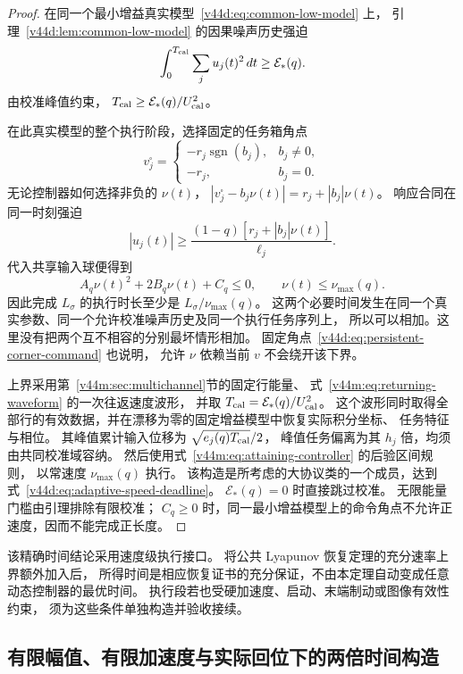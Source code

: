 \documentclass[11pt,a4paper]{article}
\numberwithin{equation}{section}
\theoremstyle{definition}
\begin{document}
\begin{proof}
在同一个最小增益真实模型~\eqref{v44d:eq:common-low-model} 上，
引理~\ref{v44d:lem:common-low-model} 的因果噪声历史强迫
\[
 \int_0^{T_{\rm cal}}\sum_j u_j(t)^2\,dt\ge\mathcal E_*(q).
\]
由校准峰值约束，
$T_{\rm cal}\ge\mathcal E_*(q)/U_{\rm cal}^2$。

在此真实模型的整个执行阶段，选择固定的任务箱角点
\begin{equation}
 v_j^\square=
 \begin{cases}
 -r_j\operatorname{sgn}(b_j),&b_j\ne0,\\
 -r_j,&b_j=0.
 \end{cases}
 \label{v44d:eq:persistent-corner-command}
\end{equation}
无论控制器如何选择非负的 $\nu(t)$，
$|v_j^\square-b_j\nu(t)|=r_j+|b_j|\nu(t)$。
响应合同在同一时刻强迫
\[
 |u_j(t)|\ge
 \frac{(1-q)[r_j+|b_j|\nu(t)]}{\ell_j}.
\]
代入共享输入球便得到
\[
 A_q\nu(t)^2+2B_q\nu(t)+C_q\le0,
 \qquad \nu(t)\le\nu_{\max}(q).
\]
因此完成 $L_\sigma$ 的执行时长至少是
$L_\sigma/\nu_{\max}(q)$。
这两个必要时间发生在同一个真实参数、同一个允许校准噪声历史及同一个执行任务序列上，
所以可以相加。这里没有把两个互不相容的分别最坏情形相加。
固定角点~\eqref{v44d:eq:persistent-corner-command} 也说明，
允许 $\nu$ 依赖当前 $v$ 不会绕开该下界。

上界采用第~\ref{v44m:sec:multichannel}节的固定行能量、
式~\eqref{v44m:eq:returning-waveform} 的一次往返速度波形，
并取 $T_{\rm cal}=\mathcal E_*(q)/U_{\rm cal}^2$。
这个波形同时取得全部行的有效数据，并在漂移为零的固定增益模型中恢复实际积分坐标、
任务特征与相位。
其峰值累计输入位移为 $\sqrt{e_j(q)T_{\rm cal}}/2$，
峰值任务偏离为其 $h_j$ 倍，均须由共同校准域容纳。
然后使用式~\eqref{v44m:eq:attaining-controller} 的后验区间规则，
以常速度 $\nu_{\max}(q)$ 执行。
该构造是所考虑的大协议类的一个成员，达到式~\eqref{v44d:eq:adaptive-speed-deadline}。
$\mathcal E_*(q)=0$ 时直接跳过校准。
无限能量门槛由引理排除有限校准；
$C_q\ge0$ 时，同一最小增益模型上的命令角点不允许正速度，因而不能完成正长度。
\end{proof}

该精确时间结论采用速度级执行接口。
将公共 Lyapunov 恢复定理的充分速率上界额外加入后，
所得时间是相应恢复证书的充分保证，不由本定理自动变成任意动态控制器的最优时间。
执行段若也受硬加速度、启动、末端制动或图像有效性约束，
须为这些条件单独构造并验收接续。

\subsection{有限幅值、有限加速度与实际回位下的两倍时间构造}
\end{document}
